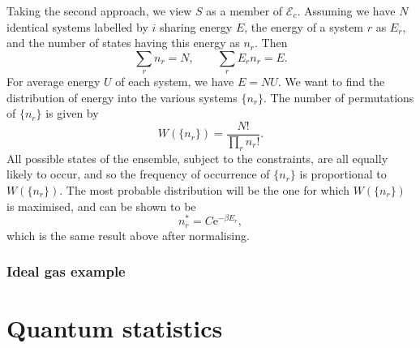 \documentclass[letter-paper]{tufte-book}
\newcommand{\ex}{\mathrm{e}}
\begin{document}
Taking the second approach, we view $S$ as a member of $\mathcal{E}_c$. Assuming
we have $N$ identical systems labelled by $i$ sharing energy $E$, the energy of
a system $r$ as $E_r$, and the number of states having this energy as $n_r$.
Then
\begin{equation*}
  \sum_r n_r = N, \qquad \sum_r E_r n_r = E.
\end{equation*}
For average energy $U$ of each system, we have $E = NU$. We want to find the
distribution of energy into the various systems $\{n_r\}$. The number of
permutations of $\{n_r\}$ is given by
\begin{equation*}
  W(\{n_r\}) = \frac{N!}{\prod_r n_r !}.
\end{equation*}
All possible states of the ensemble, subject to the constraints, are all equally
likely to occur, and so the frequency of occurrence of $\{n_r\}$ is proportional
to $W(\{n_r\})$. The most probable distribution will be the one for which
$W(\{n_r\})$ is maximised, and can be shown to be
\begin{equation*}
  n_r^* = C\ex^{-\beta E_r},
\end{equation*}
which is the same result above after normalising.


\subsection{Ideal gas example}


\chapter{Quantum statistics}










\mainmatter




%


\end{document}
